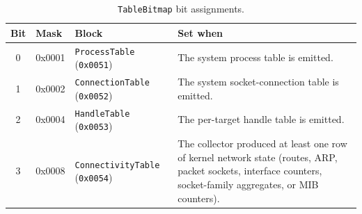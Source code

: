 \documentclass[11pt,a4paper]{article}
\newcommand{\field}[1]{\texttt{#1}}
\begin{document}
\begin{table}[H]\centering\caption{\field{TableBitmap} bit assignments.}\label{tab:sysctx-bitmap}\small
\begin{tabular}{c l l p{5.5cm}}\toprule
\textbf{Bit} & \textbf{Mask} & \textbf{Block} & \textbf{Set when} \\\midrule
0 & 0x0001 & \field{ProcessTable} (\texttt{0x0051}) & The system process table is emitted. \\
1 & 0x0002 & \field{ConnectionTable} (\texttt{0x0052}) & The system socket-connection table is emitted. \\
2 & 0x0004 & \field{HandleTable} (\texttt{0x0053}) & The per-target handle table is emitted. \\
3 & 0x0008 & \field{ConnectivityTable} (\texttt{0x0054}) & The collector produced at least one row of kernel network state (routes, ARP, packet sockets, interface counters, socket-family aggregates, or MIB counters). \\
\bottomrule
\end{tabular}\end{table}
\end{document}
